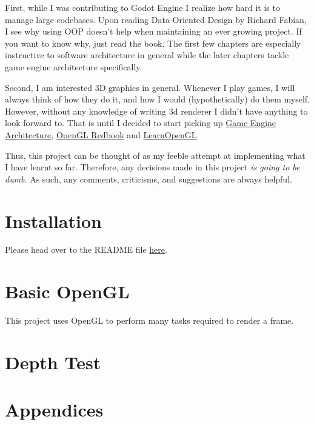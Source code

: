 \documentclass[a4paper,14pt]{extbook}
\begin{document}
First, while I was contributing to Godot Engine I realize how hard it is to manage large codebases.
Upon reading Data-Oriented Design by Richard Fabian, I see why using OOP doesn't help when maintaining an ever growing project.
If you want to know why, just read the book.
The first few chapters are especially instructive to software architecture in general while the later chapters tackle game engine architecture specifically.

Second, I am interested 3D graphics in general.
Whenever I play games, I will always think of how they do it, and how I would (hypothetically) do them myself.
However, without any knowledge of writing 3d renderer I didn't have anything to look forward to.
That is until I decided to start picking up \href{https://www.amazon.ca/Game-Engine-Architecture-Jason-Gregory/dp/1568814135}{Game Engine Architecture}, \href{https://www.cs.utexas.edu/users/fussell/courses/cs354/handouts/Addison.Wesley.OpenGL.Programming.Guide.8th.Edition.Mar.2013.ISBN.0321773039.pdf}{OpenGL Redbook} and \href{https://learnopengl.com}{LearnOpenGL}

Thus, this project can be thought of as my feeble attempt at implementing what I have learnt so far.
Therefore, any decisions made in this project \textit{is going to be dumb}.
As such, any comments, criticisms, and suggestions are always helpful.

\newpage
\section{Installation}

Please head over to the README file \href{run:./../README.md}{here}.

\newpage
\section{Basic OpenGL}

This project uses OpenGL to perform many tasks required to render a frame.


\newpage
\section{Depth Test}


\section{Appendices}
\end{document}
